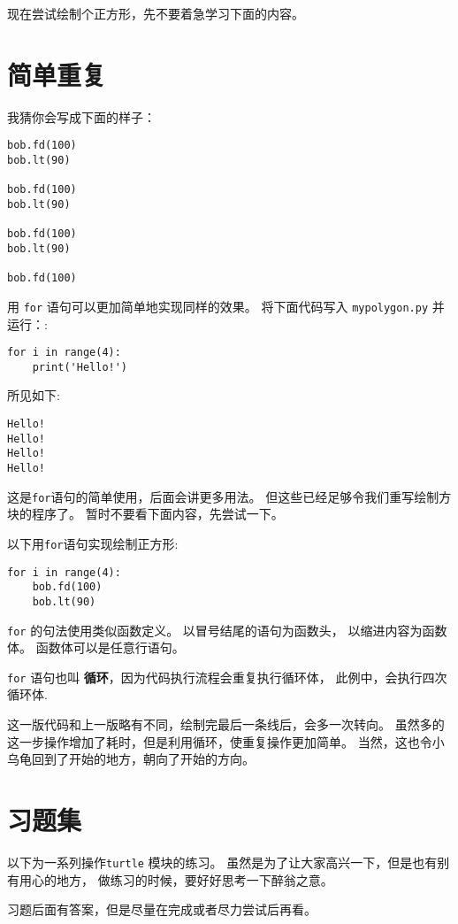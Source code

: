 \documentclass[10pt]{book}
\begin{document}
现在尝试绘制个正方形，先不要着急学习下面的内容。


\section{简单重复}
\label{repetition}

我猜你会写成下面的样子：

\begin{verbatim}
bob.fd(100)
bob.lt(90)

bob.fd(100)
bob.lt(90)

bob.fd(100)
bob.lt(90)

bob.fd(100)
\end{verbatim}
%
用 {\tt for} 语句可以更加简单地实现同样的效果。
将下面代码写入 {\tt mypolygon.py} 并运行：:

\begin{verbatim}
for i in range(4):
    print('Hello!')
\end{verbatim}
%
所见如下:

\begin{verbatim}
Hello!
Hello!
Hello!
Hello!
\end{verbatim}
%
这是{\tt for}语句的简单使用，后面会讲更多用法。
但这些已经足够令我们重写绘制方块的程序了。
暂时不要看下面内容，先尝试一下。

以下用{\tt for}语句实现绘制正方形:

\begin{verbatim}
for i in range(4):
    bob.fd(100)
    bob.lt(90)
\end{verbatim}
%
{\tt for} 的句法使用类似函数定义。
以冒号结尾的语句为函数头，
以缩进内容为函数体。
函数体可以是任意行语句。

 {\tt for} 语句也叫 {\bf 循环}，因为代码执行流程会重复执行循环体，
此例中，会执行四次循环体.

这一版代码和上一版略有不同，绘制完最后一条线后，会多一次转向。
虽然多的这一步操作增加了耗时，但是利用循环，使重复操作更加简单。
当然，这也令小乌龟回到了开始的地方，朝向了开始的方向。

\section{习题集}
以下为一系列操作{\tt turtle} 模块的练习。
虽然是为了让大家高兴一下，但是也有别有用心的地方，
做练习的时候，要好好思考一下醉翁之意。

习题后面有答案，但是尽量在完成或者尽力尝试后再看。
\end{document}
